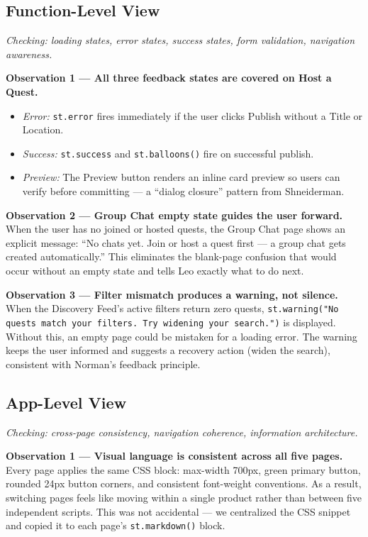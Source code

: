 \documentclass[11pt]{article}
\begin{document}
\subsection{Function-Level View}

\textit{Checking: loading states, error states, success states, form validation, navigation awareness.}

\textbf{Observation 1 --- All three feedback states are covered on Host a Quest.}
\begin{itemize}[nosep]
    \item \textit{Error:} \texttt{st.error} fires immediately if the user clicks Publish without a Title or Location.
    \item \textit{Success:} \texttt{st.success} and \texttt{st.balloons()} fire on successful publish.
    \item \textit{Preview:} The Preview button renders an inline card preview so users can verify before committing --- a ``dialog closure'' pattern from Shneiderman.
\end{itemize}

\textbf{Observation 2 --- Group Chat empty state guides the user forward.}
When the user has no joined or hosted quests, the Group Chat page shows an explicit message: ``No chats yet. Join or host a quest first --- a group chat gets created automatically.'' This eliminates the blank-page confusion that would occur without an empty state and tells Leo exactly what to do next.

\textbf{Observation 3 --- Filter mismatch produces a warning, not silence.}
When the Discovery Feed's active filters return zero quests, \texttt{st.warning("No quests match your filters. Try widening your search.")} is displayed. Without this, an empty page could be mistaken for a loading error. The warning keeps the user informed and suggests a recovery action (widen the search), consistent with Norman's feedback principle.

\subsection{App-Level View}

\textit{Checking: cross-page consistency, navigation coherence, information architecture.}

\textbf{Observation 1 --- Visual language is consistent across all five pages.}
Every page applies the same CSS block: max-width 700px, green primary button, rounded 24px button corners, and consistent font-weight conventions. As a result, switching pages feels like moving within a single product rather than between five independent scripts. This was not accidental --- we centralized the CSS snippet and copied it to each page's \texttt{st.markdown()} block.
\end{document}
